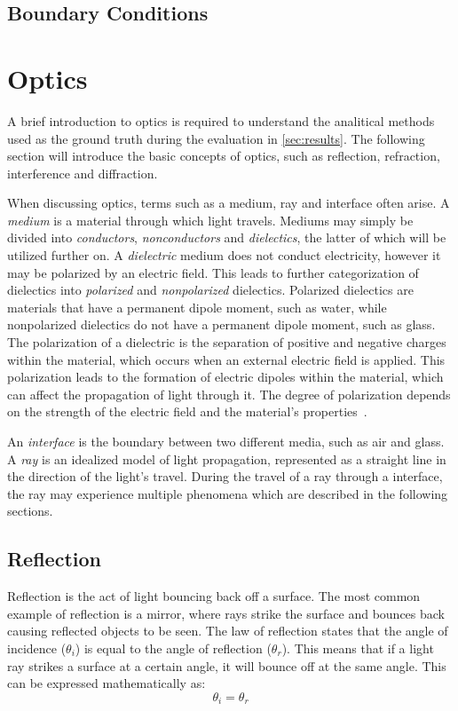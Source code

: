 \subsection{Boundary Conditions}

\section{Optics}
A brief introduction to optics is required to understand the analitical methods used as the ground truth during the evaluation in \cref{sec:results}. The following section will introduce the basic concepts of optics, such as reflection, refraction, interference and diffraction.

When discussing optics, terms such as a medium, ray and interface often arise. A \emph{medium} is a material through which light travels. Mediums may simply be divided into \emph{conductors}, \emph{nonconductors} and \emph{dielectics}, the latter of which will be utilized further on. A \emph{dielectric} medium does not conduct electricity, however it may be polarized by an electric field. This leads to further categorization of dielectics into \emph{polarized} and \emph{nonpolarized} dielectics. Polarized dielectics are materials that have a permanent dipole moment, such as water, while nonpolarized dielectics do not have a permanent dipole moment, such as glass. The polarization of a dielectric is the separation of positive and negative charges within the material, which occurs when an external electric field is applied. This polarization leads to the formation of electric dipoles within the material, which can affect the propagation of light through it. The degree of polarization depends on the strength of the electric field and the material's properties~\cite[Chapter~6]{cermak}.

An \emph{interface} is the boundary between two different media, such as air and glass. A \emph{ray} is an idealized model of light propagation, represented as a straight line in the direction of the light's travel. During the travel of a ray through a interface, the ray may experience multiple phenomena which are described in the following sections.



\subsection{Reflection}
Reflection is the act of light bouncing back off a surface. The most common example of reflection is a mirror, where rays strike the surface and bounces back causing reflected objects to be seen. The law of reflection states that the angle of incidence ($\theta_i$) is equal to the angle of reflection ($\theta_r$). This means that if a light ray strikes a surface at a certain angle, it will bounce off at the same angle. This can be expressed mathematically as:
\begin{equation}
  \theta_i = \theta_r
  \end{equation}


